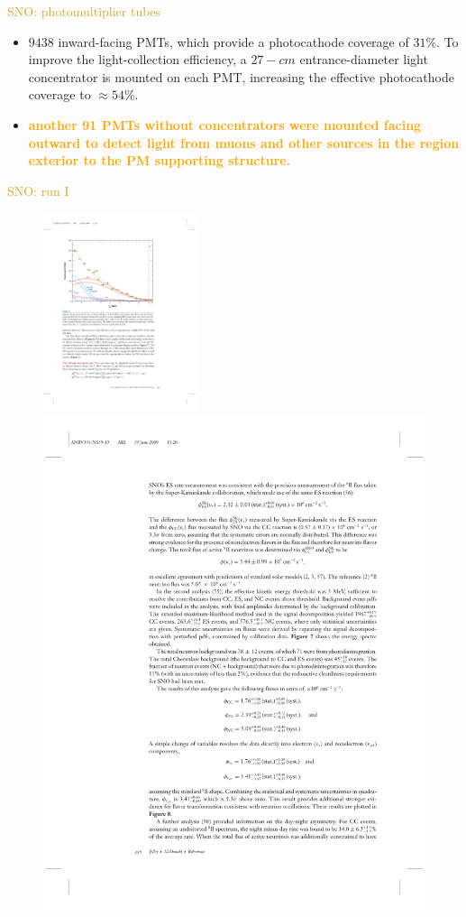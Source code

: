 \documentclass[11pt]{beamer} %
\renewcommand{\(}{\begin{columns}}
\renewcommand{\)}{\end{columns}}
\newcommand{\<}[1]{\begin{column}{#1}}
\renewcommand{\>}{\end{column}}
\newcommand{\itt}{\begin{itemize}}
\newcommand{\tti}{\end{itemize}}
\newcommand{\hlt}[2]{\textcolor{#1}{\textbf{#2}}}
\begin{document}
\begin{frame}{\textcolor{Goldenrod}{SNO:  photomultiplier tubes}}
    \itt[<+->]
  \item $9438$ inward-facing PMTs, which provide a photocathode
    coverage of $31$\%. \alert{To improve the light-collection efficiency,
      a $27-cm$ entrance-diameter light concentrator is mounted on each PMT,
      increasing the effective photocathode coverage to $\approx 54$\%.}
    
  \item \hlt{Orange}{another 91 PMTs without concentrators were
      mounted facing outward to detect light from muons and other sources in
      the region exterior to the PM supporting structure.}
    \tti
\end{frame}


\begin{frame}{\textcolor{Goldenrod}{SNO: run I}}
  \begin{overlayarea}{\textwidth}{\textheight}
    \begin{figure}[h]
      \centering
      \includegraphics[height=0.20\textwidth,width=0.4\textwidth]{./Images/SNO07}
      \includegraphics{./Images/SNO09}\\

\end{figure}
\end{overlayarea}
\end{frame}
\end{document}
